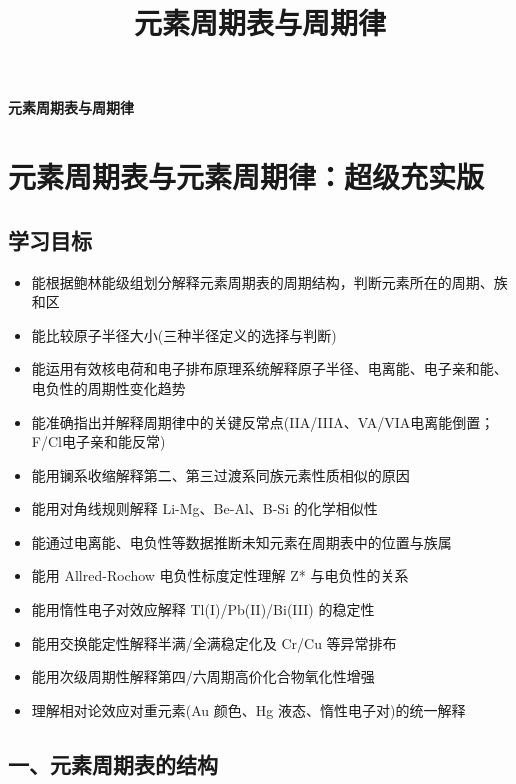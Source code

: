 \documentclass[a4paper,11pt]{ctexart}
\title{元素周期表与周期律}
\date{}
\providecommand{\tightlist}{\setlength{\itemsep}{0pt}\setlength{\parskip}{0pt}}
\newcommand{\箭}{\ensuremath{\rightarrow}}
\newcommand{\左箭}{\ensuremath{\leftarrow}}
\newcommand{\上箭}{\ensuremath{\uparrow}}
\newcommand{\下箭}{\ensuremath{\downarrow}}
\newcommand{\衡}{\ensuremath{\rightleftharpoons}}
\newcommand{\双箭}{\ensuremath{\leftrightarrow}}
\newcommand{\约等于}{\ensuremath{\approx}}
\newcommand{\小于等于}{\ensuremath{\leq}}
\newcommand{\大于等于}{\ensuremath{\geq}}
\newcommand{\不等于}{\ensuremath{\neq}}
\newcommand{\西格马}{\ensuremath{\sigma}}
\newcommand{\派}{\ensuremath{\pi}}
\begin{document}
\thispagestyle{plain}
\begin{center}
{\bfseries 元素周期表与周期律\par}
\end{center}
\vspace{1em}
\section{元素周期表与元素周期律：超级充实版}\label{ux5143ux7d20ux5468ux671fux8868ux4e0eux5143ux7d20ux5468ux671fux5f8bux8d85ux7ea7ux5145ux5b9eux7248}

\subsection{学习目标}\label{ux5b66ux4e60ux76eeux6807}

\begin{itemize}
\tightlist
\item
  能根据鲍林能级组划分解释元素周期表的周期结构，判断元素所在的周期、族和区
\item
  能比较原子半径大小(三种半径定义的选择与判断)
\item
  能运用有效核电荷和电子排布原理系统解释原子半径、电离能、电子亲和能、电负性的周期性变化趋势
\item
  能准确指出并解释周期律中的关键反常点(IIA/IIIA、VA/VIA电离能倒置；F/Cl电子亲和能反常)
\item
  能用镧系收缩解释第二、第三过渡系同族元素性质相似的原因
\item
  能用对角线规则解释 Li-Mg、Be-Al、B-Si 的化学相似性
\item
  能通过电离能、电负性等数据推断未知元素在周期表中的位置与族属
\item
  能用 Allred-Rochow 电负性标度定性理解 Z* 与电负性的关系
\item
  能用惰性电子对效应解释 Tl(I)/Pb(II)/Bi(III) 的稳定性
\item
  能用交换能定性解释半满/全满稳定化及 Cr/Cu 等异常排布
\item
  能用次级周期性解释第四/六周期高价化合物氧化性增强
\item
  理解相对论效应对重元素(Au 颜色、Hg 液态、惰性电子对)的统一解释
\end{itemize}

\subsection{一、元素周期表的结构}\label{ux4e00ux5143ux7d20ux5468ux671fux8868ux7684ux7ed3ux6784}
\end{document}
